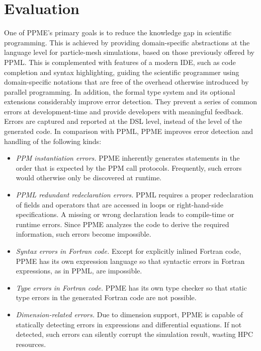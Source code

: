 
\section{Evaluation}
\label{sec:evaluation}
%
\label{par:evaluation-reducing_the_knowledge_gap}
One of PPME's primary goals is to reduce the knowledge gap in scientific programming.
This is achieved by providing domain-specific abstractions at the language level for
particle-mesh simulations, based on those previously offered by PPML. This is
complemented with features of a modern IDE, such as code completion and syntax highlighting,
guiding the scientific programmer using domain-specific notations 
that are free of the overhead otherwise introduced by parallel programming.  
%
In addition, the formal type system and its optional
extensions considerably improve error detection. They prevent a series of common
errors at development-time and provide developers with meaningful feedback. Errors
are captured and reported at the DSL level, instead of the level of the generated code.
In comparison with PPML, PPME improves error detection and handling of the following kinds:
%
\begin{itemize}
%
\item \emph{PPM instantiation errors.} PPME inherently generates statements in the order
that is expected by the PPM call protocols. Frequently, such errors would otherwise only be 
discovered at runtime.
%
\item \emph{PPML redundant redeclaration errors.} PPML requires a proper redeclaration of
fields and operators that are accessed in loops or right-hand-side specifications. A missing 
or wrong declaration leads to compile-time or runtime errors. Since PPME
analyzes the code to derive the required information, such errors become impossible.
%
\item \emph{Syntax errors in Fortran code.} Except for explicitly inlined Fortran code, PPME 
has its own expression language so that syntactic errors in Fortran expressions, as in PPML,
are impossible.
%
\item \emph{Type errors in Fortran code.} PPME has its own type checker so that static 
type errors in the generated Fortran code are not possible.
%
\item \emph{Dimension-related errors.} Due to dimension support, PPME is capable of 
statically detecting errors in expressions and differential equations. If not detected, such errors
can silently corrupt the simulation result, wasting HPC resources.
\end{itemize}  


